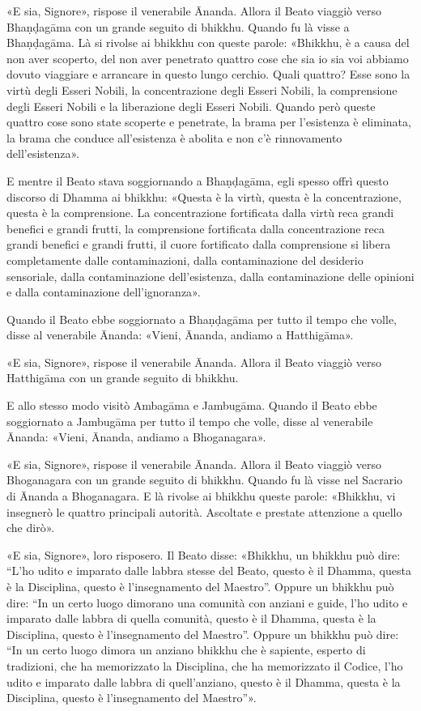 «E sia, Signore», rispose il venerabile Ānanda. Allora il Beato viaggiò
verso Bhaṇḍagāma con un grande seguito di bhikkhu. Quando fu là visse a
Bhaṇḍagāma. Là si rivolse ai bhikkhu con queste parole: «Bhikkhu, è a
causa del non aver scoperto, del non aver penetrato quattro cose che sia
io sia voi abbiamo dovuto viaggiare e arrancare in questo lungo cerchio.
Quali quattro? Esse sono la virtù degli Esseri Nobili, la concentrazione
degli Esseri Nobili, la comprensione degli Esseri Nobili e la
liberazione degli Esseri Nobili. Quando però queste quattro cose sono
state scoperte e penetrate, la brama per l’esistenza è eliminata, la
brama che conduce all’esistenza è abolita e non c’è rinnovamento
dell’esistenza».




E mentre il Beato stava soggiornando a Bhaṇḍagāma, egli spesso offrì
questo discorso di Dhamma ai bhikkhu: «Questa è la virtù, questa è la
concentrazione, questa è la comprensione. La concentrazione fortificata
dalla virtù reca grandi benefici e grandi frutti, la comprensione
fortificata dalla concentrazione reca grandi benefici e grandi frutti,
il cuore fortificato dalla comprensione si libera completamente dalle
contaminazioni, dalla contaminazione del desiderio sensoriale, dalla
contaminazione dell’esistenza, dalla contaminazione delle opinioni e
dalla contaminazione dell’ignoranza».


Quando il Beato ebbe soggiornato a Bhaṇḍagāma per tutto il tempo che
volle, disse al venerabile Ānanda: «Vieni, Ānanda, andiamo a
Hatthigāma».


«E sia, Signore», rispose il venerabile Ānanda. Allora il Beato viaggiò
verso Hatthigāma con un grande seguito di bhikkhu.


E allo stesso modo visitò Ambagāma e Jambugāma. Quando il Beato ebbe
soggiornato a Jambugāma per tutto il tempo che volle, disse al
venerabile Ānanda: «Vieni, Ānanda, andiamo a Bhoganagara».


«E sia, Signore», rispose il venerabile Ānanda. Allora il Beato viaggiò
verso Bhoganagara con un grande seguito di bhikkhu. Quando fu là visse
nel Sacrario di Ānanda a Bhoganagara. E là rivolse ai bhikkhu queste
parole: «Bhikkhu, vi insegnerò le quattro principali autorità. Ascoltate
e prestate attenzione a quello che dirò».


«E sia, Signore», loro risposero. Il Beato disse: «Bhikkhu, un bhikkhu
può dire: “L’ho udito e imparato dalle labbra stesse del Beato, questo è
il Dhamma, questa è la Disciplina, questo è l’insegnamento del Maestro”.
Oppure un bhikkhu può dire: “In un certo luogo dimorano una comunità con
anziani e guide, l’ho udito e imparato dalle labbra di quella comunità,
questo è il Dhamma, questa è la Disciplina, questo è l’insegnamento del
Maestro”. Oppure un bhikkhu può dire: “In un certo luogo dimora un
anziano bhikkhu che è sapiente, esperto di tradizioni, che ha
memorizzato la Disciplina, che ha memorizzato il Codice, l’ho udito e
imparato dalle labbra di quell’anziano, questo è il Dhamma, questa è la
Disciplina, questo è l’insegnamento del Maestro”».



